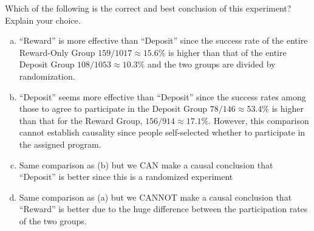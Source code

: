 \documentclass[
  ignorenonframetext, 10pt
]{beamer}
\providecommand{\tightlist}{%
  \setlength{\itemsep}{0pt}\setlength{\parskip}{0pt}}
\begin{document}
\begin{frame}{}
\protect\hypertarget{section}{}
Which of the following is the correct and best conclusion of this
experiment? Explain your choice.

\begin{enumerate}
[(a)]
\tightlist
\item
  ``Reward'' is more effective than ``Deposit'' since the success rate
  of the entire Reward-Only Group \(159/1017\approx15.6\)\% is higher
  than that of the entire Deposit Group \(108/1053\approx10.3\)\% and
  the two groups are divided by randomization.
\item
  ``Deposit'' seems more effective than ``Deposit'' since the success
  rates among those to agree to participate in the Deposit Group
  \(78/146\approx 53.4\%\) is higher than that for the Reward Group,
  \(156/914\approx 17.1\%\). However, this comparison cannot establish
  causality since people self-selected whether to participate in the
  assigned program.
\item
  Same comparison as (b) but we CAN make a causal conclusion that
  ``Deposit'' is better since this is a randomized experiment
\item
  Same comparison as (a) but we CANNOT make a causal conclusion that
  ``Reward'' is better due to the huge difference between the
  participation rates of the two groups.
\end{enumerate}
\end{frame}
\end{document}
